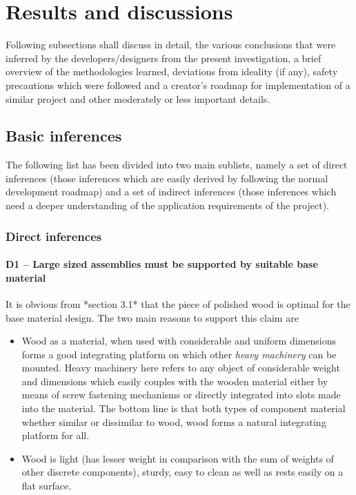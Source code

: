 \chapter{Results and discussions}
Following subsections shall discuss in detail, the various conclusions that were inferred by the developers/designers from the present investigation, a brief overview of the methodologies learned, deviations from ideality (if any), safety precautions which were followed and a creator’s roadmap for implementation of a similar project and other moderately or less important details.


\section{Basic inferences}

The following list has been divided into two main sublists, namely a set of direct inferences (those inferences which are easily derived by following the normal development roadmap) and a set of indirect inferences (those inferences which need a deeper understanding of the application requirements of the project).

\subsection{Direct inferences}

\subsubsection*{D1 – Large sized assemblies must be supported by suitable base material}

It is obvious from *section 3.1* that the piece of polished wood is optimal for the base material design. The two main reasons to support this claim are 

\begin{itemize}
    \item Wood as a material, when used with considerable and uniform dimensions forms a good integrating platform on which other \textit{heavy machinery} can be mounted. Heavy machinery here refers to any object of considerable weight and dimensions which easily couples with the wooden material either by means of screw fastening mechanisms or directly integrated into slots made into the material. The bottom line is that both types of component material whether similar or dissimilar to wood, wood forms a natural integrating platform for all.
    \item Wood is light (has lesser weight in comparison with the sum of weights of other discrete components), sturdy, easy to clean as well as rests easily on a flat surface.
\end{itemize}

